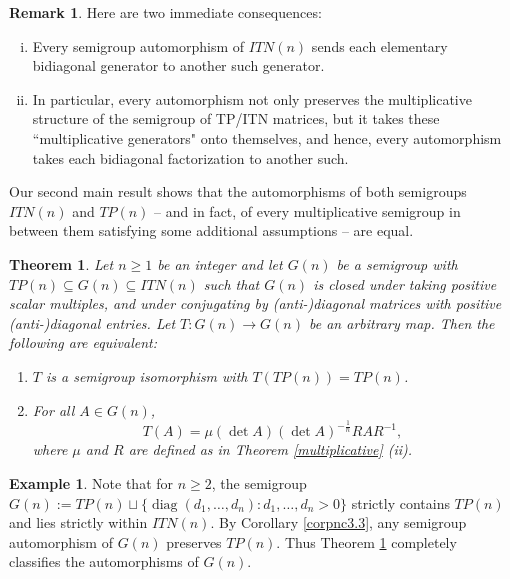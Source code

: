 \documentclass[11pt,reqno]{amsart}
\theoremstyle{plain}
\newtheorem{utheorem}{\textrm{\textbf{Theorem}}}
\theoremstyle{definition}
\newtheorem{rem}[theorem]{Remark}
\newtheorem{example}[theorem]{Example}
\numberwithin{equation}{section}
\DeclareMathOperator{\diag}{diag}
\begin{document}
\begin{rem}Here are two immediate consequences:
	\begin{enumerate}[(i)]
		\item Every semigroup automorphism of $ITN(n)$ sends each elementary bidiagonal generator to another such generator.
		\item In particular, every automorphism not only preserves the multiplicative structure of the semigroup of TP/ITN matrices, but it takes these ``multiplicative generators" onto themselves, and hence, every automorphism takes each bidiagonal factorization to another such.
	\end{enumerate}
\end{rem}
Our second main result shows that the automorphisms of both semigroups $ITN(n)$ and $TP(n)$ -- and in fact, of every multiplicative semigroup in between them satisfying some additional assumptions -- are equal.
\begin{utheorem}\label{multiplicative2} Let $n\geq 1$ be an integer and let $G(n)$ be a semigroup with $TP(n) \subseteq G(n) \subseteq ITN(n)$ such that $G(n)$ is closed under taking positive scalar multiples, and under conjugating by (anti-)diagonal matrices with positive (anti-)diagonal entries. Let $T : G(n) \to G(n)$ be an arbitrary map. Then the following are equivalent:
\begin{enumerate}
	\item[(i)] $T$ is a semigroup isomorphism with $T(TP(n))=TP(n)$.
	\item[(ii)] For all $A\in G(n)$,
	\[T(A) = \mu(\det A)(\det A)^{-\frac{1}{n}} RAR^{-1},\]
	where $\mu$ and $R$ are defined as in Theorem \ref{multiplicative} (ii).
\end{enumerate}
\end{utheorem}
\begin{example}
Note that for $n \geq 2$, the semigroup $G(n):=TP(n)\sqcup\{\diag(d_1,\ldots,d_n): d_1,\ldots,d_n>0\}$ strictly contains  $TP(n)$  and lies strictly within $ITN(n)$. By Corollary \ref{corpnc3.3}, any semigroup automorphism of $G(n)$ preserves  $TP(n)$. Thus Theorem \ref{multiplicative2} completely classifies the automorphisms of $G(n)$.
\end{example}
\end{document}

